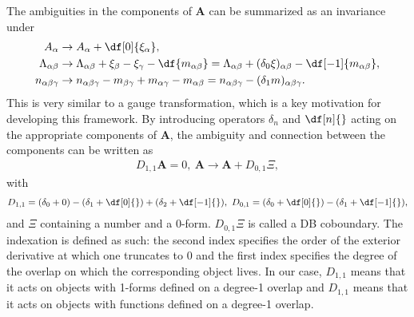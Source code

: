 The ambiguities in the components of $\mathbf{A}$ can be summarized as an invariance under
\begin{align*}
	A_{\alpha}            &\to A_{\alpha} + \df[0]{\xi_{\alpha}}, \\
	\Lambda_{\alpha\beta} &\to \Lambda_{\alpha\beta} + \xi_{\beta} - \xi_{\gamma} - \df{m_{\alpha\beta}} = \Lambda_{\alpha\beta} + (\delta_{0}\xi)_{\alpha\beta} - \df[-1]{m_{\alpha\beta}}, \\
	n_{\alpha\beta\gamma} &\to n_{\alpha\beta\gamma} - m_{\beta\gamma} + m_{\alpha\gamma} - m_{\alpha\beta} = n_{\alpha\beta\gamma} - (\delta_{1}m)_{\alpha\beta\gamma}.
\end{align*}
This is very similar to a gauge transformation, which is a key motivation for developing this framework. By introducing operators $\delta_{n}$ and $\df[n]{}$ acting on the appropriate components of $\mathbf{A}$, the ambiguity and connection between the components can be written as
\begin{align*}
	D_{1, 1}\mathbf{A} = 0,\ \mathbf{A} \to \mathbf{A} + D_{0, 1}\Xi,
\end{align*}
with
\begin{align*}
	D_{1, 1} = (\delta_{0} + 0) - (\delta_{1} + \df[0]{}) + (\delta_{2} + \df[-1]{}),\ D_{0, 1} = (\delta_{0} + \df[0]{}) - (\delta_{1} + \df[-1]{}),
\end{align*}
and $\Xi$ containing a number and a 0-form. $D_{0, 1}\Xi$ is called a DB coboundary. The indexation is defined as such: the second index specifies the order of the exterior derivative at which one truncates to 0 and the first index specifies the degree of the overlap on which the corresponding object lives. In our case, $D_{1, 1}$ means that it acts on objects with 1-forms defined on a degree-1 overlap and $D_{1, 1}$ means that it acts on objects with functions defined on a degree-1 overlap.

